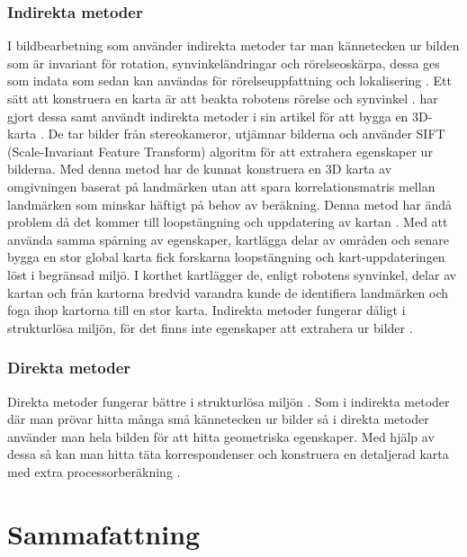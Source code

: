 \subsection{Indirekta metoder}

I bildbearbetning som använder indirekta metoder tar man kännetecken ur bilden som är invariant för rotation, synvinkeländringar och rörelseoskärpa, dessa ges som indata som sedan kan användas för rörelseuppfattning och lokalisering \citep{geospatial}. Ett sätt att konstruera en karta är att beakta robotens rörelse och synvinkel \citep{globalsubmaps}. \cite{mapbuildingsift} har gjort dessa samt användt indirekta metoder i sin artikel  för att bygga en 3D-karta \citep{mapbuildingsift}. De tar bilder från stereokameror, utjämnar bilderna och använder SIFT (Scale-Invariant Feature Transform) algoritm för att extrahera egenskaper ur bilderna. Med denna metod har de kunnat konstruera en 3D karta av omgivningen baserat på landmärken utan att spara korrelationsmatris mellan landmärken som minskar häftigt på behov av beräkning. Denna metod har ändå problem då det kommer till loopstängning och uppdatering av kartan \citep{globalsubmaps}. Med att använda samma spårning av egenskaper, kartlägga delar av områden och senare bygga en stor global karta fick forskarna loopstängning och kart-uppdateringen löst i begränsad miljö. I korthet kartlägger de, enligt robotens synvinkel, delar av kartan och från kartorna bredvid varandra kunde de identifiera landmärken och foga ihop kartorna till en stor karta. Indirekta metoder fungerar dåligt i strukturlösa miljön, för det finns inte egenskaper att extrahera ur bilder \citep{geospatial}.

\subsection{Direkta metoder}

Direkta metoder fungerar bättre i strukturlösa miljön \citep{Engel2014LSDSLAMLD}. Som i indirekta metoder där man prövar hitta många små kännetecken ur bilder så i direkta metoder använder man hela bilden för att hitta geometriska egenskaper. Med hjälp av dessa så kan man hitta täta korrespondenser och konstruera en detaljerad karta med extra processorberäkning \citep{geospatial}. 

\chapter{Sammafattning}

